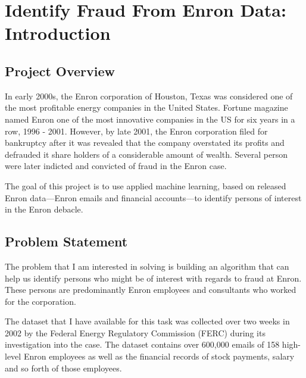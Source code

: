\documentclass[titlepage,numbers=noenddot,headinclude,%
               footinclude=true,abstractoff,BCOR=5mm,%
               paper=a4,fontsize=11pt,ngerman,american]{scrreprt}
\numberwithin{theorem}{chapter}
\numberwithin{definition}{chapter}
\numberwithin{algorithm}{chapter}
\numberwithin{figure}{chapter}
\numberwithin{table}{chapter}
\numberwithin{equation}{chapter}
\begin{document}
\frenchspacing
\raggedbottom
{}
\pagestyle{plain}




\chapter*{Identify Fraud From Enron Data: Introduction}



\section*{Project Overview}

In early 2000s, the Enron corporation of Houston, Texas was considered one of the most profitable energy companies in the United States. Fortune magazine named Enron one of the most innovative companies in the US for six years in a row, 1996 - 2001. However, by late 2001, the Enron corporation filed for bankruptcy after it was revealed that the company overstated its profits and defrauded it share holders of a considerable amount of wealth. Several person were later indicted and convicted of fraud in the Enron case.

The goal of this project is to use applied machine learning, based on released Enron data---Enron emails and financial accounts---to identify persons of interest in the Enron debacle.


\section*{Problem Statement}

The problem that I am interested in solving is building an algorithm that can help us identify persons who might be of interest with regards to fraud at Enron. These persons are predominantly Enron employees and consultants who worked for the corporation.

The dataset that I have available for this task was collected over two weeks in 2002 by the Federal Energy Regulatory Commission (FERC) during its investigation into the case. The dataset contains over 600,000 emails of 158 high-level Enron employees as well as the financial records of stock payments, salary and so forth of those employees.
\end{document}

